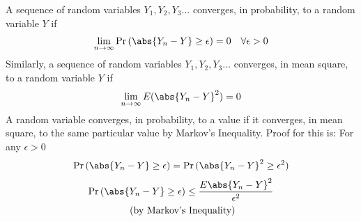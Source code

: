 
A sequence of random variables $Y_1,Y_2,Y_3\hdots$ converges, in probability, to a random variable $Y$ if
\begin{align}
    \lim_{n\rightarrow \infty}\Pr{(\abs{Y_n-Y}\geq \epsilon)} = 0 \quad \forall \epsilon >0
\end{align}
Similarly, a sequence of random variables $Y_1,Y_2,Y_3\hdots$ converges, in mean square, to a random variable $Y$ if
\begin{align}
    \lim_{n\rightarrow \infty} E(\abs{Y_n-Y}^2) = 0 
\end{align}
A random variable converges, in probability, to a value if it converges, in mean square, to the same particular value by Markov's Inequality. Proof for this is: For any $\epsilon > 0$
\begin{align}
    \Pr{(\abs{Y_n-Y}\geq \epsilon)} = \Pr{(\abs{Y_n-Y}^2\geq \epsilon^2)}
\end{align}
\begin{multline}
    \Pr{(\abs{Y_n-Y}\geq \epsilon)}  \leq \frac{E\abs{Y_n-Y}^2}{\epsilon^2} 
    \\\text{ (by Markov's Inequality)}
\end{multline}
 
